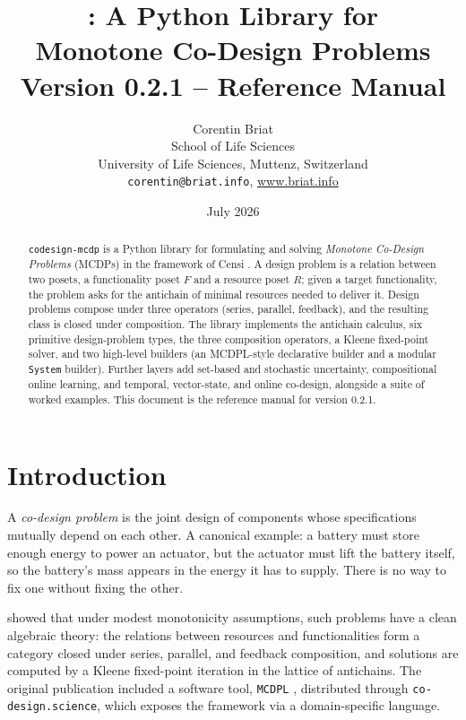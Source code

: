 \documentclass[11pt,a4paper]{article}
\title{\codename: A Python Library for \\ Monotone Co-Design Problems \\
       \vspace{0.4em} \large Version 0.2.1 -- Reference Manual}
\author{Corentin Briat\\ School of Life Sciences\\
University of Life Sciences, Muttenz, Switzerland\\
\texttt{corentin@briat.info}, \url{www.briat.info}}
\date{July 2026}
\newcommand{\codename}{\texttt{codesign-mcdp}}
\begin{document}
\maketitle

\begin{abstract}
\noindent \codename{} is a Python library for formulating and solving
\emph{Monotone Co-Design Problems} (MCDPs) in the framework of Censi
\citep{censi2015mathematical}. A design problem is a relation between two posets, a functionality
poset $F$ and a resource poset $R$; given a target functionality, the
problem asks for the antichain of minimal resources needed to deliver it.
Design problems compose under three operators (series, parallel,
feedback), and the resulting class is closed under composition. The
library implements the antichain calculus, six primitive design-problem
types, the three composition operators, a Kleene fixed-point solver, and
two high-level builders (an MCDPL-style declarative builder and a modular
\texttt{System} builder). Further layers add set-based and stochastic
uncertainty, compositional online learning, and temporal, vector-state,
and online co-design, alongside a suite of worked examples. This document
is the reference manual for version 0.2.1.
\end{abstract}

\tableofcontents
\bigskip

\section{Introduction}

A \emph{co-design problem} is the joint design of components whose
specifications mutually depend on each other. A canonical example: a
battery must store enough energy to power an actuator, but the actuator
must lift the battery itself, so the battery's mass appears in the
energy it has to supply. There is no way to fix one without fixing the
other.

\citet{censi2015mathematical} showed that under modest monotonicity
assumptions, such problems have a clean algebraic theory: the relations
between resources and functionalities form a category closed under
series, parallel, and feedback composition, and solutions are computed
by a Kleene fixed-point iteration in the lattice of antichains. The
original publication included a software tool, \texttt{MCDPL}
\citep{mcdpl}, distributed through \texttt{co-design.science}, which
exposes the framework via a domain-specific language.
\end{document}
